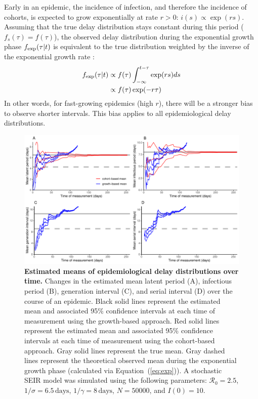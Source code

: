 \documentclass[12pt]{article}
\newcommand{\eref}[1]{(\ref{eq:#1})}
\begin{document}
Early in an epidemic, the incidence of infection, and therefore the incidence of cohorts, is expected to grow exponentially at rate $r > 0$: $i(s) \propto \exp(rs)$.
Assuming that the true delay distribution stays constant during this period ($f_s(\tau) = f(\tau)$), 
the observed delay distribution during the exponential growth phase $f_{\tiny\textrm{exp}}(\tau|t)$ is equivalent to the true distribution weighted by the inverse of the exponential growth rate \citep{britton2019estimation}:
\begin{equation}
\begin{aligned}
f_{\tiny\textrm{exp}}(\tau|t) &\propto f(\tau) \int_{-\infty}^{t-\tau} \exp(rs) ds\\
&\propto f(\tau) \exp(-r\tau) \\
\end{aligned}
\end{equation}
In other words, for fast-growing epidemics (high $r$), there will be a stronger bias to observe shorter intervals.
This bias applies to all epidemiological delay distributions.

\begin{figure}[!th]
\includegraphics[width=\textwidth]{figure_seir2.pdf}
\caption{
\textbf{Estimated means of epidemiological delay distributions over time.}
Changes in the estimated mean latent period (A), infectious period (B), generation interval (C), and serial interval (D) over the course of an epidemic.
Black solid lines represent the estimated mean and associated 95\% confidence intervals at each time of measurement using the growth-based approach.
Red solid lines represent the estimated mean and associated 95\% confidence intervals at each time of measurement using the cohort-based approach.
Gray solid lines represent the true mean.
Gray dashed lines represent the theoretical observed mean during the exponential growth phase (calculated via Equation~\eref{exp}).
A stochastic SEIR model was simulated using the following parameters: $\mathcal R_0 = 2.5$, $1/\sigma = 6.5\,\textrm{days}$, $1/\gamma = 8\,\textrm{days}$, $N=50000$, and $I(0)=10$.
}
\label{fig:seir2}
\end{figure}
\end{document}
